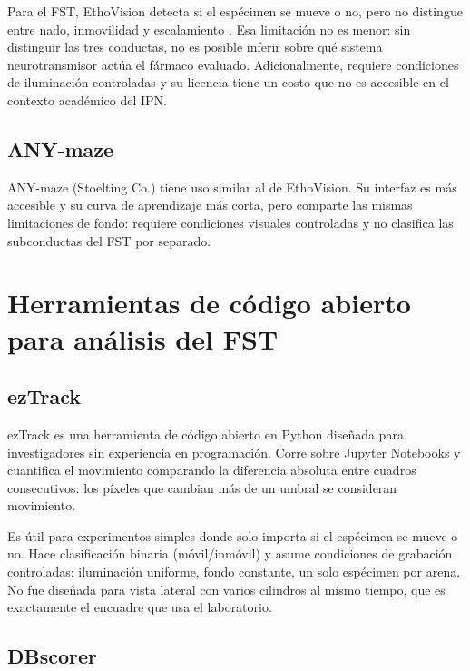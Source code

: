 Para el FST, EthoVision detecta si el espécimen se mueve o no, pero no distingue entre
nado, inmovilidad y escalamiento \cite{della_valle2025}. Esa limitación no es menor:
sin distinguir las tres conductas, no es posible inferir sobre qué sistema
neurotransmisor actúa el fármaco evaluado. Adicionalmente, requiere condiciones de
iluminación controladas y su licencia tiene un costo que no es accesible en el contexto
académico del IPN.

\subsection{ANY-maze}

ANY-maze (Stoelting Co.) \cite{stoelting_anymaze} tiene uso similar al de EthoVision. Su interfaz es más
accesible y su curva de aprendizaje más corta, pero comparte las mismas limitaciones
de fondo: requiere condiciones visuales controladas y no clasifica las subconductas del
FST por separado.

\section{Herramientas de código abierto para análisis del FST}

\subsection{ezTrack}

ezTrack \cite{pennington2019_eztrack} es una herramienta de código abierto en Python
diseñada para investigadores sin experiencia en programación. Corre sobre Jupyter
Notebooks y cuantifica el movimiento comparando la diferencia absoluta entre cuadros
consecutivos: los píxeles que cambian más de un umbral se consideran movimiento.

Es útil para experimentos simples donde solo importa si el espécimen se mueve o no.
Hace clasificación binaria (móvil/inmóvil) y asume condiciones de grabación
controladas: iluminación uniforme, fondo constante, un solo espécimen por arena. No fue diseñada para
vista lateral con varios cilindros al mismo tiempo, que es exactamente el encuadre
que usa el laboratorio.

\subsection{DBscorer}

